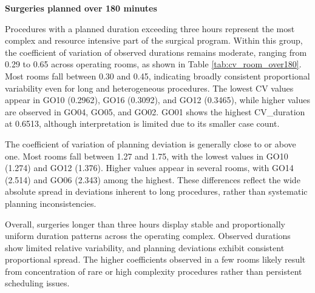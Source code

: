 \documentclass[
]{article}
\begin{document}
\vspace{1em}

\noindent\textbf{Surgeries planned over 180 minutes} \vspace{0.5em}

Procedures with a planned duration exceeding three hours represent the
most complex and resource intensive part of the surgical program. Within
this group, the coefficient of variation of observed durations remains
moderate, ranging from 0.29 to 0.65 across operating rooms, as shown in
Table \ref{tab:cv_room_over180}. Most rooms fall between 0.30 and 0.45,
indicating broadly consistent proportional variability even for long and
heterogeneous procedures. The lowest CV values appear in GO10 (0.2962),
GO16 (0.3092), and GO12 (0.3465), while higher values are observed in
GO04, GO05, and GO02. GO01 shows the highest CV\_duration at 0.6513,
although interpretation is limited due to its smaller case count.

The coefficient of variation of planning deviation is generally close to
or above one. Most rooms fall between 1.27 and 1.75, with the lowest
values in GO10 (1.274) and GO12 (1.376). Higher values appear in several
rooms, with GO14 (2.514) and GO06 (2.343) among the highest. These
differences reflect the wide absolute spread in deviations inherent to
long procedures, rather than systematic planning inconsistencies.

Overall, surgeries longer than three hours display stable and
proportionally uniform duration patterns across the operating complex.
Observed durations show limited relative variability, and planning
deviations exhibit consistent proportional spread. The higher
coefficients observed in a few rooms likely result from concentration of
rare or high complexity procedures rather than persistent scheduling
issues.
\end{document}
